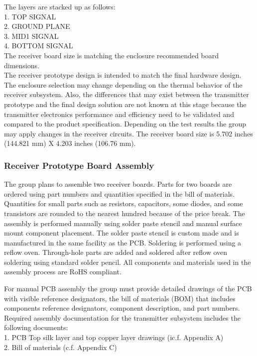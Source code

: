 \documentclass[12pt]{article}
\begin{document}
 \noindent
The layers are stacked up as follows:\\
1. TOP SIGNAL\\
2. GROUND PLANE\\
3. MID1 SIGNAL\\
4. BOTTOM SIGNAL\\

\noindent
The receiver board size is matching the enclosure recommended board dimensions.\\

\indent
The receiver prototype design is intended to match the final hardware design. The enclosure selection may change depending on the thermal behavior of the receiver subsystem. Also, the differences that may exist between the transmitter prototype and the final design solution are not known at this stage because the transmitter electronics performance and efficiency need to be validated and compared to the product specification. Depending on the test results the group may apply changes in the receiver circuits.
The receiver board size is  5.702 inches (144.821 mm) X 4.203 inches (106.76 mm).

\subsubsection{Receiver Prototype Board Assembly}

\indent
The group plans to assemble two receiver boards. Parts for two boards are ordered using part numbers and quantities specified in the bill of materials. Quantities for small parts such as resistors, capacitors, some diodes, and some transistors are rounded to the nearest hundred because of the price break. The assembly is performed manually using solder paste stencil and manual surface mount component placement. The solder paste stencil is custom made and is manufactured in the same facility as the PCB. Soldering is performed using a reflow oven. Through-hole parts are added and soldered after reflow oven soldering using standard solder pencil. All components and materials used in the assembly process are RoHS compliant.

\hfill
\pagebreak
\hfill

\indent
For manual PCB assembly the group must provide detailed drawings of the PCB with visible reference designators, the bill of materials (BOM)  that includes components reference designators, component description, and part numbers.\\
 
 \noindent
Required assembly documentation for the transmitter subsystem includes the following documents:\\
1. PCB Top silk layer and top copper layer drawings (ic.f. Appendix A)\\
2. Bill of materials (c.f. Appendix C)\\
 
\end{document}
